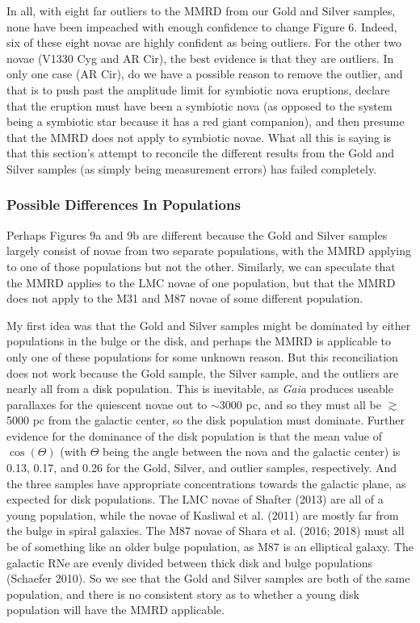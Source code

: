 \documentclass[a4paper,fleqn,usenatbib]{mnras}
\begin{document}
	In all, with eight far outliers to the MMRD from our Gold and Silver samples, none have been impeached with enough confidence to change Figure 6.  Indeed, six of these eight novae are highly confident as being outliers.  For the other two novae (V1330 Cyg and AR Cir), the best evidence is that they are outliers.  In only one case (AR Cir), do we have a possible reason to remove the outlier, and that is to push past the amplitude limit for symbiotic nova eruptions, declare that the eruption must have been a symbiotic nova (as opposed to the system being a symbiotic star because it has a red giant companion), and then presume that the MMRD does not apply to symbiotic novae.  What all this is saying is that this section's attempt to reconcile the different results from the Gold and Silver samples (as simply being measurement errors) has failed completely.

\subsubsection{Possible Differences In Populations}

	Perhaps Figures 9a and 9b are different because the Gold and Silver samples largely consist of novae from two separate populations, with the MMRD applying to one of those populations but not the other.  Similarly, we can speculate that the MMRD applies to the LMC novae of one population, but that the MMRD does not apply to the M31 and M87 novae of some different population.
	
	My first idea was that the Gold and Silver samples might be dominated by either populations in the bulge or the disk, and perhaps the MMRD is applicable to only one of these populations for some unknown reason.  But this reconciliation does not work because the Gold sample, the Silver sample, and the outliers are nearly all from a disk population.  This is inevitable, as {\it Gaia} produces useable parallaxes for the quiescent novae out to $\sim$3000 pc, and so they must all be $\gtrsim$5000 pc from the galactic center, so the disk population must dominate.  Further evidence for the dominance of the disk population is that the mean value of $\cos(\Theta)$ (with $\Theta$ being the angle between the nova and the galactic center) is 0.13, 0.17, and 0.26 for the Gold, Silver, and outlier samples, respectively.  And the three samples have appropriate concentrations towards the galactic plane, as expected for disk populations.  The LMC novae of Shafter (2013) are all of a young population, while the novae of Kasliwal et al. (2011) are mostly far from the bulge in spiral galaxies.  The M87 novae of Shara et al. (2016; 2018) must all be of something like an older bulge population, as M87 is an elliptical galaxy.  The galactic RNe are evenly divided between thick disk and bulge populations (Schaefer 2010).  So we see that the Gold and Silver samples are both of the same population, and there is no consistent story as to whether a young disk population will have the MMRD applicable.
	
\end{document}
